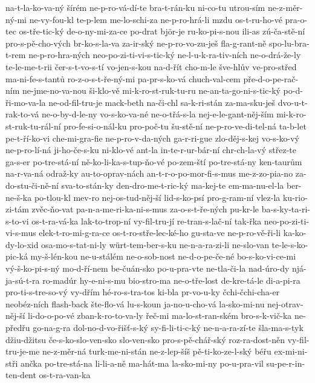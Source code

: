 na-t-la-ko-va-ný
šírém
ne-p-ro-vá-dí-te
bra-t-rán-ku
ni-co-tu
utrou-sím
ne-z-měr-ný-mi
ne-vy-fou-kl
te-p-lem
me-lo-schi-za
ne-p-ro-hrá-li
mzdu
os-t-ru-ho-vé
pra-o-tec
os-tře-tic-ký
de-o-ny-mi-za-ce
po-drat
björ-je
ru-ko-pi-s-nou
ili-as
zú-ča-stě-ní
pro-s-pě-cho-vých
br-ko-s-la-va
za-ir-ský
ne-p-ro-vo-zu-ješ
fla-g-rant-ně
spo-lu-bra-t-rem
ne-p-ro-hra-ných
neo-po-zi-ti-vi-s-tic-ký
ne-l-u-k-ra-tiv-ních
ne-o-drá-že-ly
te-le-me-t-rii
čer-s-t-vo-s-tí
vo-jen-s-kou
na-d-řít
cho-m-le
šve-hlův
ve-pro-střed
ma-ni-fe-s-tantů
ro-z-o-s-t-ře-ný-mi
pa-pr-s-ko-vá
chuch-val-cem
pře-d-o-pe-rač-ním
ne-jme-no-va-nou
ši-klo-vě
mi-k-ro-st-ruk-tu-ru
ne-an-ta-go-ni-s-tic-ký
po-d-ři-mo-va-la
ne-od-fil-tru-je
mack-beth
na-či-chl
sa-k-ri-stán
za-ma-sku-ješ
dvo-u-t-rak-to-vá
ne-o-by-d-le-ny
vo-s-ko-va-né
ne-o-třá-s-la
nej-e-le-gant-něj-ším
mi-k-ro-st-ruk-tu-rál-ní
pro-fe-si-o-nál-ku
pro-poč-tu
šu-stě-ní
ne-p-ro-ve-di-tel-ná
ta-b-let
pe-t-ří-ko-vi
che-mi-gra-fie
ne-p-ro-v-da-ných
ga-r-ri-gue
zlo-děj-s-kej
vo-s-ko-vý
ne-p-ro-lí-ná
ji-ho-če-s-ku
ni-klo-vé
ant-la
in-te-r-ur-bár-ní
chr-ch-la-vý
střez-te
ga-s-er
po-tre-stá-ní
ně-ko-li-ka-s-tup-ňo-vé
po-zem-ští
po-tre-stá-ny
ken-taurům
na-r-va-ná
odraž-ky
au-to-oprav-nách
an-t-r-o-po-mor-fi-s-mus
me-z-zo-pia-no
za-do-stu-či-ně-ní
sva-to-stán-ky
den-dro-me-t-ric-ký
ma-kej-te
em-ma-nu-el-la
ber-ne-š-ka
po-tlou-kl
mev-ro
nej-os-tud-něj-ší
lid-s-ko-psí
pro-g-ram-ní
vlez-la
ku-rio-zi-tám
zvěc-ňo-vat
pa-n-a-me-ri-ka-ni-s-mus
za-o-s-t-ře-ných
pu-kr-le
ba-s-ky-ta-ri-s-to-vi
os-t-ra-vá-ka
lak-to-trop-ní
vy-fil-tru-jí
re-tran-s-lač-ní
tak-řka
neo-po-zi-ti-vi-s-mus
elek-t-ro-mi-g-ra-ce
os-t-ro-stře-lec-ké-ho
gu-sta-ve
ne-p-ro-vě-ři-li
ka-ko-dy-lo-xid
osa-mo-s-tat-ni-ly
würt-tem-ber-s-ku
ne-n-a-ra-zi-li
ne-slo-van
te-le-s-ko-pic-ká
my-š-lén-kou
ne-u-stálém
ne-o-sob-nost
ne-d-o-pe-če-né
bo-s-ko-vi-ce-mi
vý-š-ko-pi-s-ný
mo-d-ří-nem
be-čuán-sko
po-u-pra-vte
ne-tla-či-la
nad-úro-dy
njá-ja-sú-t-ra
ro-madúr
hy-e-ni-s-mu
bio-stro-ma
ne-o-tře-lost
de-kre-tá-le
di-a-pi-ra
pro-ti-s-tre-so-vý
vy-dřím
hé-ro-s-tra-tos
ki-bla
pr-vo-u-ky
čchi-čchi-cha-er
neobéz-ních
flash-back
šte-flo-vá
lu-s-koun
ja-no-u-cho-vá
la-sko-mi-nu
nej-otrav-něj-ší
li-do-o-po-vé
zban-k-ro-to-va-ly
řeč-mi
ma-lo-st-ran-ském
bro-s-k-vič-ka
ne-předřu
go-na-g-ra
dol-no-d-vo-řišť-s-ký
sy-fi-li-ti-c-ký
ne-n-a-ra-zí-te
šla-ma-s-tyk
džiu-džitsu
če-s-ko-slo-ven-sko
slo-ven-sko
pro-s-pě-chář-ský
roz-ra-dost-něn
vy-fil-tru-je-me
ne-z-měr-ná
turk-me-ni-stán
ne-z-lep-šíš
pě-ti-ko-ze-l-ský
béřu
ex-mi-ni-stři
ančka
po-tre-stá-na
li-li-a-ně
ma-hát-ma
la-sko-mi-ny
po-u-pra-vil
su-pe-r-in-ten-dent
os-t-ra-van-ka
